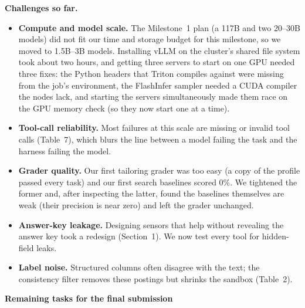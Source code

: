 \documentclass[11pt]{article}
\begin{document}
\textbf{Challenges so far.}
\begin{itemize}
  \item \textbf{Compute and model scale.} The Milestone~1 plan (a 117B and two 20--30B models) did not fit our time and storage budget for this milestone, so we moved to 1.5B--3B models. Installing vLLM on the cluster's shared file system took about two hours, and getting three servers to start on one GPU needed three fixes: the Python headers that Triton compiles against were missing from the job's environment, the FlashInfer sampler needed a CUDA compiler the nodes lack, and starting the servers simultaneously made them race on the GPU memory check (so they now start one at a time).
  \item \textbf{Tool-call reliability.} Most failures at this scale are missing or invalid tool calls (Table~7), which blurs the line between a model failing the task and the harness failing the model.
  \item \textbf{Grader quality.} Our first tailoring grader was too easy (a copy of the profile passed every task) and our first search baselines scored 0\%. We tightened the former and, after inspecting the latter, found the baselines themselves are weak (their precision is near zero) and left the grader unchanged.
  \item \textbf{Answer-key leakage.} Designing sensors that help without revealing the answer key took a redesign (Section~1). We now test every tool for hidden-field leaks.
  \item \textbf{Label noise.} Structured columns often disagree with the text; the consistency filter removes these postings but shrinks the sandbox (Table~2).
\end{itemize}

\textbf{Remaining tasks for the final submission}
\end{document}
